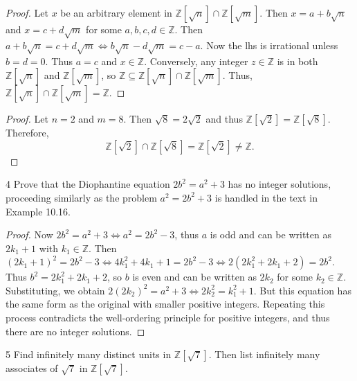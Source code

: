 \begin{proof}
    Let $x$ be an arbitrary element in $\mathbb{Z}[\sqrt{n}] \cap \mathbb{Z}[\sqrt{m}]$.
    Then $x = a + b\sqrt{n}$ and $x = c + d\sqrt{m}$ for some $a, b, c, d \in \mathbb{Z}$.
    Then $a + b\sqrt{n} = c + d\sqrt{m} \iff b\sqrt{n} - d\sqrt{m} = c - a$. 
    Now the lhs is irrational unless $b = d = 0$.
    Thus $a = c$ and $x \in \mathbb{Z}$.
    Conversely, any integer $z \in \mathbb{Z}$ is in both $\mathbb{Z}[\sqrt{n}]$ and $\mathbb{Z}[\sqrt{m}]$,
    so $\mathbb{Z} \subseteq \mathbb{Z}[\sqrt{n}] \cap \mathbb{Z}[\sqrt{m}]$.
    Thus, $\mathbb{Z}[\sqrt{n}] \cap \mathbb{Z}[\sqrt{m}] = \mathbb{Z}$.
\end{proof}

\begin{proof}
    Let $n = 2$ and $m = 8$.
    Then $\sqrt{8} = 2\sqrt{2}$ and thus $\mathbb{Z}[\sqrt{2}] = \mathbb{Z}[\sqrt{8}]$.
    Therefore,
    \[
        \mathbb{Z}[\sqrt{2}] \cap \mathbb{Z}[\sqrt{8}] = \mathbb{Z}[\sqrt{2}] \neq \mathbb{Z}.
    \]
\end{proof}

\begin{problem}{4}
    Prove that the Diophantine equation $2b^2 = a^2 + 3$ has no 
        integer solutions, proceeding similarly as the problem 
        $a^2 = 2b^2 + 3$ is handled in the text in Example 10.16.
\end{problem}
\solved

\begin{proof}
    Now $2b^2 = a^2 + 3 \iff a^2 = 2b^2 - 3$, thus $a$ is odd
        and can be written as $2k_1 + 1$ with $k_1 \in \mathbb{Z}$.
    Then $(2k_1 + 1)^2 = 2b^2 - 3 \iff 4 k_1^2 + 4k_1 + 1 = 2b^2 - 3 \iff 2(2k_1^2 + 2k_1 + 2) = 2b^2$.
    Thus $b^2 = 2k_1^2 + 2k_1 + 2$, so $b$ is even and can be written as $2k_2$ for some $k_2 \in \mathbb{Z}$.
    Substituting, we obtain $2(2k_2)^2 = a^2 + 3 \iff 2k_2^2 = k_1^2 + 1$.
    But this equation has the same form as the original with smaller positive integers.
    Repeating this process contradicts the well-ordering principle for positive integers,
     and thus there are no integer solutions.
\end{proof}

\begin{problem}{5}
    Find infinitely many distinct units in $\mathbb{Z}[\sqrt{7}]$. 
    Then list infinitely many associates of $\sqrt{7}$ in $\mathbb{Z}[\sqrt{7}]$.
\end{problem}
\solved


